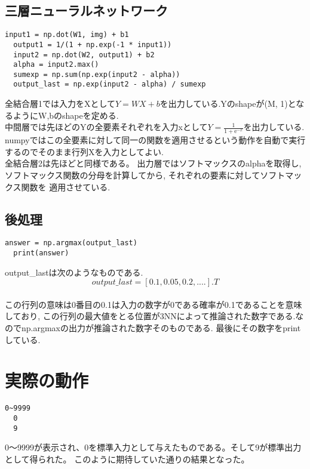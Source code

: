 \documentclass[a4paper,11pt]{jsarticle}
\begin{document}
\subsection{三層ニューラルネットワーク}

\begin{lstlisting}[caption = 3NN]
  input1 = np.dot(W1, img) + b1
  output1 = 1/(1 + np.exp(-1 * input1))
  input2 = np.dot(W2, output1) + b2
  alpha = input2.max()
  sumexp = np.sum(np.exp(input2 - alpha))
  output_last = np.exp(input2 - alpha) / sumexp
\end{lstlisting}
\par
全結合層1では入力をXとして$ Y = WX + b $を出力している.Yのshapeが(M, 1)となるようにW,bのshapeを定める.\\
中間層では先ほどのYの全要素それぞれを入力xとして$Y = \frac{1}{1 + \mathrm{e}^{-x}} $を出力している.
numpyではこの全要素に対して同一の関数を適用させるという動作を自動で実行するのでそのまま行列Xを入力としてよい.\\
全結合層2は先ほどと同様である。
出力層ではソフトマックスのalphaを取得し,ソフトマックス関数の分母を計算してから, それぞれの要素に対してソフトマックス関数を
適用させている.
\subsection{後処理}
\begin{lstlisting}[caption=after-processing]
  answer = np.argmax(output_last)
  print(answer)
\end{lstlisting}
output\_lastは次のようなものである.\\
$$output\_last = [0.1, 0.05, 0.2, ....].T$$\\
この行列の意味は0番目の0.1は入力の数字が0である確率が0.1であることを意味しており,
この行列の最大値をとる位置が3NNによって推論された数字である.なのでnp.argmaxの出力が推論された数字そのものである.
最後にその数字をprintしている.
\section{実際の動作}
\begin{lstlisting}[caption=result]
  0~9999
  0 
  9
\end{lstlisting}
0～9999が表示され、0を標準入力として与えたものである。そして9が標準出力として得られた。
このように期待していた通りの結果となった。
\end{document}
